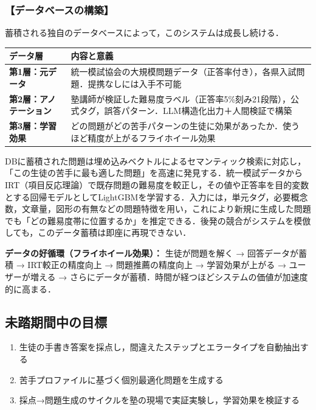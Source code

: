 \documentclass[paper=a4,fontsize=10.5bp,jafontsize=10.5bp,twocolumn]{jlreq}
\begin{document}
\subsubsection{【データベースの構築】}

蓄積される独自のデータベースによって，このシステムは成長し続ける．

\begin{scriptsize}\noindent
\begin{tabularx}{\linewidth}{>{\bfseries}l X}
\toprule
データ層 & 内容と意義 \\
\midrule
第1層：元データ & 統一模試協会の大規模問題データ（正答率付き），各県入試問題．提携なしには入手不可能 \\
第2層：アノテーション & 塾講師が検証した難易度ラベル（正答率5\%刻み21段階），公式タグ，誤答パターン．LLM構造化出力＋人間検証で構築 \\
第3層：学習効果 & どの問題がどの苦手パターンの生徒に効果があったか．使うほど精度が上がるフライホイール効果 \\
\bottomrule
\end{tabularx}
\end{scriptsize}

DBに蓄積された問題は埋め込みベクトルによるセマンティック検索に対応し，「この生徒の苦手に最も適した問題」を高速に発見する．統一模試データからIRT（項目反応理論）で既存問題の難易度を較正し，その値や正答率を目的変数とする回帰モデルとしてLightGBMを学習する．入力には，単元タグ，必要概念数，文章量，図形の有無などの問題特徴を用い，これにより新規に生成した問題でも「どの難易度帯に位置するか」を推定できる．後発の競合がシステムを模倣しても，このデータ蓄積は即座に再現できない．

\begin{graybox}
\textbf{データの好循環（フライホイール効果）：}
生徒が問題を解く → 回答データが蓄積 → IRT較正の精度向上 → 問題推薦の精度向上 → 学習効果が上がる → ユーザーが増える → さらにデータが蓄積．時間が経つほどシステムの価値が加速度的に高まる．
\end{graybox}

\subsection{未踏期間中の目標}

\begin{enumerate}[leftmargin=2em]
  \item 生徒の手書き答案を採点し，間違えたステップとエラータイプを自動抽出する
  \item 苦手プロファイルに基づく個別最適化問題を生成する
  \item 採点→問題生成のサイクルを塾の現場で実証実験し，学習効果を検証する
\end{enumerate}
\end{document}
